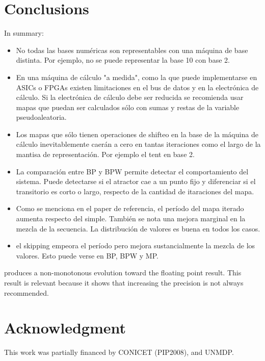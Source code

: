 \section{Conclusions}\label{sec:conclusions}
In summary:
\begin{itemize}
  \item No todas las bases numéricas son representables con una máquina de base distinta. Por ejemplo, no se puede representar la base 10 con base 2.
  \item En una máquina de cálculo "a medida", como la que puede implementarse en ASICs o FPGAs existen limitaciones en el bus de datos y en la electrónica de cálculo. Si la electrónica de cálculo debe ser reducida se recomienda usar mapas que puedan ser calculados sólo con sumas y restas de la variable pseudoaleatoria.
  \item Los mapas que sólo tienen operaciones de shifteo en la base de la máquina de cálculo inevitablemente caerán a cero en tantas iteraciones como el largo de la mantisa de representación. Por ejemplo el tent en base 2.
  \item La comparación entre BP y BPW permite detectar el comportamiento del sistema. Puede detectarse si el atractor cae a un punto fijo y diferenciar si el transitorio es corto o largo, respecto de la cantidad de itaraciones del mapa.
  \item Como se menciona en el paper de referencia, el período del mapa iterado aumenta respecto del simple. También se nota una mejora marginal en la mezcla de la secuencia. La distribución de valores es buena en todos los casos.
  \item el skipping empeora el período pero mejora sustancialmente la mezcla de los valores. Esto puede verse en BP, BPW y MP.
\end{itemize}produces a non-monotonous evolution toward the floating point result. This result is relevant because it shows that increasing the precision is not
always recommended.

\section*{Acknowledgment}
This work was partially financed by CONICET (PIP2008),  and UNMDP.
